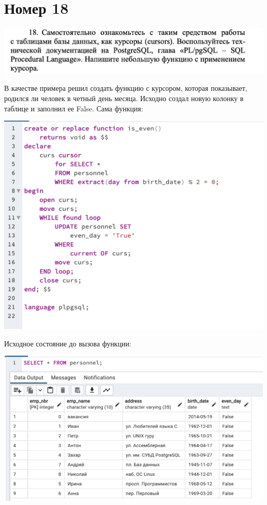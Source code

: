 \documentclass[a4paper,12pt]{article}
\begin{document}
\section*{Номер 18}
\begin{flushleft}
\includegraphics[scale=0.5]{18_1.png}
\end{flushleft}
В качестве примера решил создать функцию с курсором, которая  показывает, родился ли человек в четный день месяца. Исходно создал новую колонку в таблице и заполнил ее False. Сама функция:
\begin{flushleft}
\includegraphics[scale=0.6]{18_2.png}
\end{flushleft}
Исходное состояние до вызова функции:
\begin{flushleft}
\includegraphics[scale=0.6]{18_3.png}
\end{flushleft}
\end{document}
